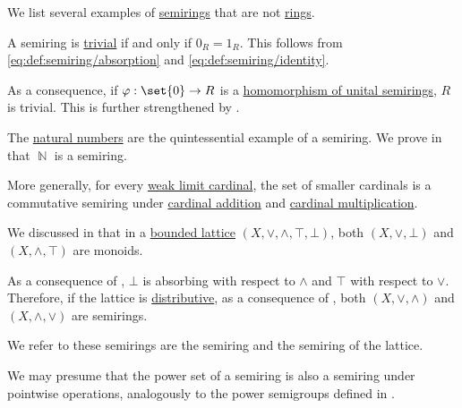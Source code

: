 \begin{example}\label{ex:def:semiring}
  We list several examples of \hyperref[def:semiring]{semirings} that are not \hyperref[def:ring]{rings}.

  \begin{thmenum}
     A semiring is \hyperref[def:semiring/trivial]{trivial} if and only if \( 0_R = 1_R \). This follows from \eqref{eq:def:semiring/absorption} and \eqref{eq:def:semiring/identity}.

    As a consequence, if \( \varphi: \set{ 0 } \to R \) is a \hyperref[def:semiring/homomorphism]{homomorphism of unital semirings}, \( R \) is trivial. This is further strengthened by .

     The \hyperref[def:natural_numbers]{natural numbers} are the quintessential example of a semiring. We prove in  that \( \BbbN \) is a semiring.

     More generally, for every \hyperref[def:successor_and_limit_cardinal/weak_limit]{weak limit cardinal}, the set of smaller cardinals is a commutative semiring under \hyperref[def:cardinal_arithmetic/addition]{cardinal addition} and \hyperref[def:cardinal_arithmetic/multiplication]{cardinal multiplication}.

     We discussed in  that in a \hyperref[def:semilattice/bounded]{bounded lattice} \( (X, \vee, \wedge, \top, \bot) \), both \( (X, \vee, \bot) \) and \( (X, \wedge, \top) \) are monoids.

    As a consequence of , \( \bot \) is absorbing with respect to \( \wedge \) and \( \top \) with respect to \( \vee \). Therefore, if the lattice is \hyperref[def:semilattice/distributive_lattice]{distributive}, as a consequence of , both \( (X, \vee, \wedge) \) and \( (X, \wedge, \vee) \) are semirings.

    We refer to these semirings are the  semiring and the  semiring of the lattice.

     We may presume that the power set of a semiring is also a semiring under pointwise operations, analogously to the power semigroups defined in .


\end{thmenum}
\end{example}
